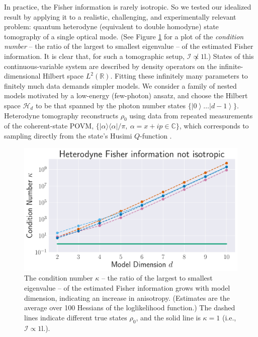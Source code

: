 \documentclass[aps,pra, twocolumn]{revtex4}
\newcommand{\reals}{\mathbb{R}}
\newcommand{\ket}[1]{\ensuremath{\left|#1\right\rangle}}
\def\Id{1\!\mathrm{l}}
\begin{document}
In practice, the Fisher information is rarely isotropic.  So we tested our idealized result by applying it to a realistic, challenging, and experimentally relevant problem: quantum heterodyne (equivalent to double homodyne) state tomography \cite{Lvovsky2001a, Bertrand1987, Leonhardt1995, Lvovsky2009} of a single optical mode.  (See Figure \ref{fig:fish_condition} for a plot of the \emph{condition number} -- the ratio of the largest to smallest eigenvalue -- of the estimated Fisher information. It is clear that, for such a tomographic setup, $\mathcal{I} \not \propto \Id$.) States of this continuous-variable system are described by density operators on the infinite-dimensional Hilbert space $L^2(\reals)$.  Fitting these infinitely many parameters to finitely much data demands simpler models.
We consider a family of nested models motivated by a low-energy (few-photon) ansatz, and choose   
the Hilbert space $\mathcal{H}_d$ to be that spanned by the photon number states $\{\ket{0}\ldots\ket{d-1}\}$.
Heterodyne tomography reconstructs $\rho_{0}$ using data from repeated measurements of the 
coherent-state POVM, $\{|\alpha\rangle\langle \alpha| /\pi, ~\alpha=x+ip\in \mathbb{C}\}$, which corresponds to sampling directly from the 
state's Husimi $Q$-function \cite{Husimi1940}.

\begin{figure}[h]
  \includegraphics[width=\columnwidth]{Images/Figure_10.pdf}
 \caption{The condition number $\kappa$ -- the ratio of the largest to smallest eigenvalue -- of the estimated Fisher information grows with model dimension, indicating an increase in anisotropy. (Estimates are the average over 100 Hessians of the loglikelihood function.) The dashed lines indicate different true states $\rho_{0}$, and the solid line is $\kappa = 1$ (i.e., $\mathcal{I} \propto \Id$.).}
\label{fig:fish_condition}
\end{figure}
\end{document}
